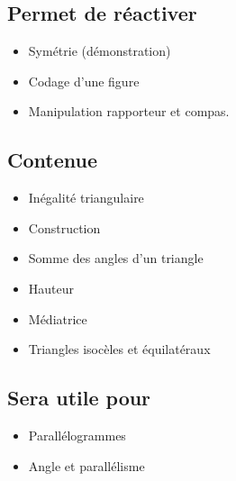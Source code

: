 \subsection{Permet de réactiver}
\begin{itemize}
    \item Symétrie (démonstration)
    \item Codage d'une figure
    \item Manipulation rapporteur et compas.
\end{itemize}

\subsection{Contenue}
\begin{itemize}
    \item Inégalité triangulaire
    \item Construction
    \item Somme des angles d'un triangle
    \item Hauteur
    \item Médiatrice
    \item Triangles isocèles et équilatéraux
\end{itemize}

\subsection{Sera utile pour}
\begin{itemize}
    \item Parallélogrammes
    \item Angle et parallélisme
\end{itemize}